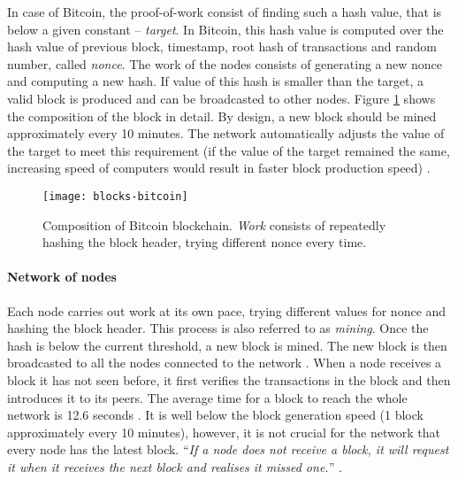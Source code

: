 In case of Bitcoin, the proof-of-work consist of finding such a hash value, that is below a given constant -- \textit{target}. In Bitcoin, this hash value is computed over the hash value of previous block, timestamp\footnotemark, root hash of transactions and random number, called \textit{nonce}. The work of the nodes consists of generating a new nonce and computing a new hash. If value of this hash is smaller than the target, a valid block is produced and can be broadcasted to other nodes. Figure \ref{fig:blocks-bitcoin} shows the composition of the block in detail. By design, a new block should be mined approximately every 10 minutes. The network automatically adjusts the value of the target to meet this requirement (if the value of the target remained the same, increasing speed of computers would result in faster block production speed) \cite{Decker2013InformationNetwork}.
% 
% 
\begin{figure}[ht]
    \centering
    \texttt{[image: blocks-bitcoin]}
    \caption{Composition of Bitcoin blockchain. \textit{Work} consists of repeatedly hashing the block header, trying different nonce every time.}
    \label{fig:blocks-bitcoin}
\end{figure}
% 
\paragraph{Network of nodes}
Each node carries out work at its own pace, trying different values for nonce and hashing the block header. This process is also referred to as \textit{mining}. Once the hash is below the current threshold, a new block is mined. The new block is then broadcasted to all the nodes connected to the network \cite{NakamotoBitcoin:System}. When a node receives a block it has not seen before, it first verifies the transactions in the block and then introduces it to its peers. The average time for a block to reach the whole network is 12.6 seconds \cite{Decker2013InformationNetwork}. It is well below the block generation speed (1 block approximately every 10 minutes), however, it is not crucial for the network that every node has the latest block. ``\textit{If a node does not receive a block, it will request it when it receives the next block and realises it missed one.}'' \cite{NakamotoBitcoin:System}.
% 
